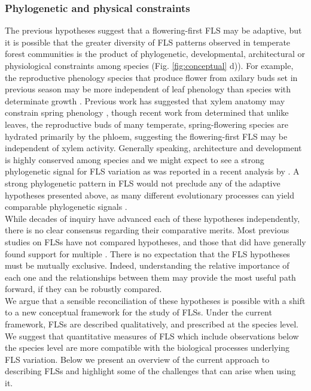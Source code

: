 \documentclass[11pt]{article}
\begin{document}
\subsubsection*{Phylogenetic and physical constraints}
\noindent {}The previous hypotheses suggest that a flowering-first FLS may be adaptive, but it is possible that the greater diversity of FLS patterns observed in temperate forest communities is the product of phylogenetic, developmental, architectural or physiological constraints among species \citep{Diggle1995,Diggle1999,Schaik1993}  (Fig. \ref{fig:conceptual} d)). For example, the reproductive phenology species that produce flower from axilary buds set in previous season may be more independent of leaf phenology than species with determinate growth \citep{Rathcke_1985,Borchert1983,Schaik1993}.  Previous work has suggested that xylem anatomy  may constrain spring phenology \citep{Lechowicz_1995}, though recent work from \citet{Savage2019} determined that unlike leaves, the reproductive buds of many temperate, spring-flowering species are hydrated primarily by the phloem, suggesting the flowering-first FLS may be independent of xylem activity. Generally speaking, architecture and development is highly conserved among species \citep{Diggle1999} and we might expect to see a strong phylogenetic signal for FLS variation as was reported in a recent analysis by \citet{Gougherty2018}. A strong phylogenetic pattern in FLS would not preclude any of the adaptive hypotheses presented above, as  many different evolutionary processes can yield comparable phylogenetic signals \citep{Revell2008}. \\

\noindent While decades of inquiry have advanced each of these hypotheses independently, there is no clear consensus regarding their comparative merits. Most previous studies on FLSs have not compared hypotheses, and those that did have generally found support for multiple \citep[see][]{Bolmgren2003,Gougherty2018}. There is no expectation that the FLS hypotheses must be mutually exclusive. Indeed, understanding the relative importance of each one and the relationships between them may provide the most useful path forward, if they can be robustly compared.\\

\noindent We argue that a sensible reconciliation of these hypotheses is possible with a shift to a new conceptual framework for the study of FLSs. Under the current framework, FLSs are described qualitatively, and prescribed at the species level. We suggest that quantitative measures of FLS which include observations below the species level are more compatible with the biological processes underlying FLS variation. Below we present an overview of the current approach to describing FLSs and highlight some of the challenges that can arise when using it. \\
\end{document}
